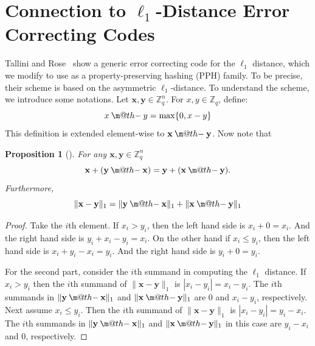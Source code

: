 \documentclass[pdflatex,sn-mathphys-num]{sn-jnl}
\makeatletter
\newcommand{\dotdiv}{\mathbin{\text{\@dotdiv}}}
\newcommand{\@dotdiv}{%
  \ooalign{\hidewidth\raise1ex\hbox{.}\hidewidth\cr$\m@th-$\cr}%
}
\newtheorem{proposition}{Proposition}
\theoremstyle{definition}
\newcommand{\vtr}[1]{\mathbf{#1}}
\newcommand{\norm}[1]{\lVert{#1}\rVert}
\makeatother
\begin{document}
\section{\texorpdfstring{Connection to $\ell_1$-Distance Error Correcting Codes}{
Connection to l1-Distance Error Correcting Codes}}
Tallini and Rose~\cite{tallinil1codes} show a generic error correcting code for the $\ell_1$ distance, which we modify to use as a property-preserving hashing (PPH) family. To be precise, their scheme is based on the asymmetric $\ell_1$-distance. To understand the scheme, we introduce some notations. Let $\vtr{x}, \vtr{y} \in \mathbb{Z}_q^n$. For $x, y \in \mathbb{Z}_q$, define:
\[
x \dotdiv y = \max\{0, x - y\}
\]
This definition is extended element-wise to $\vtr{x} \dotdiv \vtr{y}$. Now note that 
\begin{proposition}[\cite{tallinil1codes}] For any $\vtr{x}, \vtr{y} \in \mathbb{Z}_q^n$
\label{prop:dotdiv-identity}
\[
\vtr{x} + (\vtr{y} \dotdiv \vtr{x}) = \vtr{y} + (\vtr{x} \dotdiv \vtr{y}).
\]
Furthermore,
\[
\norm{\vtr{x} - \vtr{y}}_1 = \norm{\vtr{y} \dotdiv \vtr{x}}_1 + \norm{\vtr{x} \dotdiv \vtr{y}}_1
\]
\end{proposition}
\begin{proof}
Take the $i$th element. If $x_i > y_i$, then the left hand side is $x_i + 0 = x_i$. And the right hand side is $y_i + x_i - y_i = x_i$. On the other hand if $x_i \leq y_i$, then the left hand side is $x_i + y_i - x_i = y_i$. And the right hand side is $y_i + 0 = y_i$.

For the second part, consider the $i$th summand in computing the $\ell_1$ distance. If $x_i > y_i$ then the $i$th summand of $\norm{\vtr{x} - \vtr{y}}_1$ is $|x_i - y_i| = x_i - y_i$. The $i$th summands in $\norm{\vtr{y} \dotdiv \vtr{x}}_1$ and $\norm{\vtr{x} \dotdiv \vtr{y}}_1$ are $0$ and $x_i - y_i$, respectively. Next assume $x_i \leq y_i$. Then the $i$th summand of $\norm{\vtr{x} - \vtr{y}}_1$ is $|x_i - y_i| = y_i - x_i$. The $i$th summands in $\norm{\vtr{y} \dotdiv \vtr{x}}_1$ and $\norm{\vtr{x} \dotdiv \vtr{y}}_1$ in this case are $y_i - x_i$ and $0$, respectively.
\end{proof}
\end{document}
